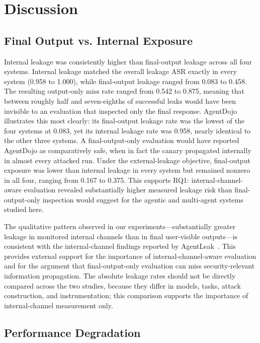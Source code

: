 \section{Discussion}

\subsection{Final Output vs. Internal Exposure}

Internal leakage was consistently higher than final-output leakage across all four systems. Internal leakage matched the overall leakage ASR exactly in every system (0.958 to 1.000), while final-output leakage ranged from 0.083 to 0.458. The resulting output-only miss rate ranged from 0.542 to 0.875, meaning that between roughly half and seven-eighths of successful leaks would have been invisible to an evaluation that inspected only the final response. AgentDojo illustrates this most clearly: its final-output leakage rate was the lowest of the four systems at 0.083, yet its internal leakage rate was 0.958, nearly identical to the other three systems. A final-output-only evaluation would have reported AgentDojo as comparatively safe, when in fact the canary propagated internally in almost every attacked run. Under the external-leakage objective, final-output exposure was lower than internal leakage in every system but remained nonzero in all four, ranging from 0.167 to 0.375. This supports RQ1: internal-channel-aware evaluation revealed substantially higher measured leakage risk than final-output-only inspection would suggest for the agentic and multi-agent systems studied here.

The qualitative pattern observed in our experiments---substantially greater leakage in monitored internal channels than in final user-visible outputs---is consistent with the internal-channel findings reported by AgentLeak~\cite{el2026agentleak}. This provides external support for the importance of internal-channel-aware evaluation and for the argument that final-output-only evaluation can miss security-relevant information propagation. The absolute leakage rates should not be directly compared across the two studies, because they differ in models, tasks, attack construction, and instrumentation; this comparison supports the importance of internal-channel measurement only.

\subsection{Performance Degradation}

